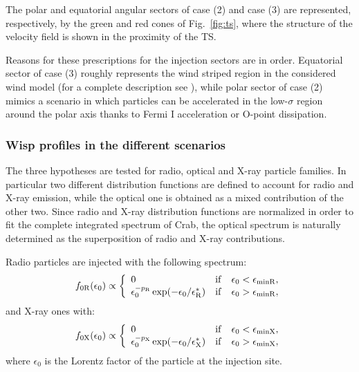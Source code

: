 The polar and equatorial angular sectors of case (2) and case (3) are represented, respectively, by the green and red cones of Fig.~\ref{fig:ts}, where the structure of the velocity field is shown in the proximity of the TS.


Reasons for these prescriptions for the injection sectors are in order. Equatorial sector of case (3) roughly represents the wind striped region in the considered wind model (for a complete description see \citet{Olmi:2014}), while polar sector of case (2) mimics a scenario in which particles can be accelerated in the low-$\sigma$ region around the polar axis thanks to Fermi I acceleration or O-point dissipation.

\subsubsection{Wisp profiles in the different scenarios}

The three hypotheses are tested for radio, optical and X-ray particle families.
In particular two different distribution functions are defined to account for radio and X-ray emission, while the optical one is obtained as a mixed contribution of the other two. 
Since radio and X-ray distribution functions are normalized in order to fit the complete integrated spectrum of Crab, the optical spectrum is naturally determined as the superposition of radio and X-ray contributions.

Radio particles are injected with the following spectrum:
\begin{equation}
f_{0\mathrm{R}}(\epsilon_0)\propto \left\{
\begin{array}{lcl}
0 & {\rm if} & \epsilon_0 < \epsilon_{\rm minR}, \\
\epsilon_0^{-p_\mathrm{R}} \exp(-\epsilon_0/\epsilon_\mathrm{R}^*) &  {\rm if} & \epsilon_0 > \epsilon_{\rm minR},\\
\end{array}
\right.
\end{equation}
and X-ray ones with:
\begin{equation}
 f_{0\mathrm{X}}(\epsilon_0)\propto \left\{ 
 \begin{array}{lcl}
 0 & {\rm if} & \epsilon_0 < \epsilon_{\rm minX}, \\
\epsilon_0^{-p_\mathrm{X}} \exp(-\epsilon_0/\epsilon_\mathrm{X}^*) &  {\rm if} & \epsilon_0 > \epsilon_{\rm minX}, \\
\end{array}
\right.
 \label{eq:Xpart}
\end{equation}
 where $\epsilon_0$ is the Lorentz factor of the particle at the injection site.
 
